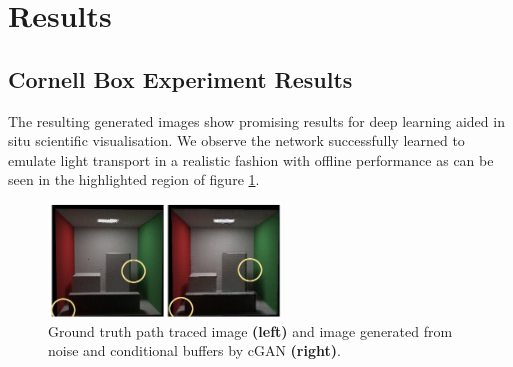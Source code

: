 \section{Results}
\subsection{Cornell Box Experiment Results}
The resulting generated images show promising results for deep learning aided in situ scientific visualisation. We observe the network successfully learned to emulate light transport in a realistic fashion with offline performance as can be seen in the highlighted region of figure \ref{fig:lighttransport}.

\begin{figure}
    \includegraphics[width=0.55\textwidth]{genDemo.png}
    \caption{Ground truth path traced image \textbf{(left)} and image generated from noise and conditional buffers by cGAN \textbf{(right)}.}
    \label{fig:lighttransport}
\end{figure}

